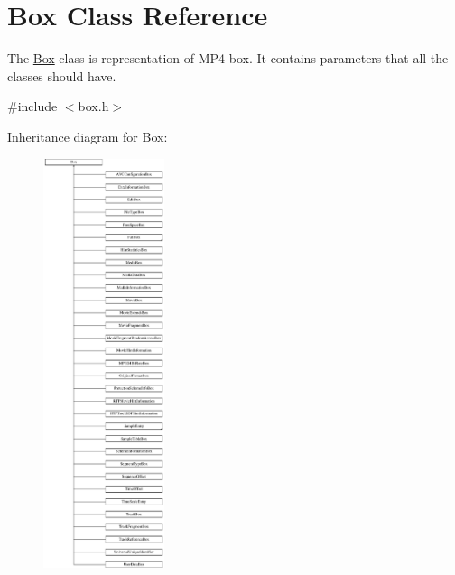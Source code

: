 \hypertarget{class_box}{\section{Box Class Reference}
\label{class_box}
}


The \hyperlink{class_box}{Box} class is representation of M\-P4 box. It contains parameters that all the classes should have.  




{\ttfamily \#include $<$box.\-h$>$}

Inheritance diagram for Box\-:\begin{figure}[H]
\begin{center}
\leavevmode
\includegraphics[height=12.000000cm]{class_box}
\end{center}
\end{figure}
